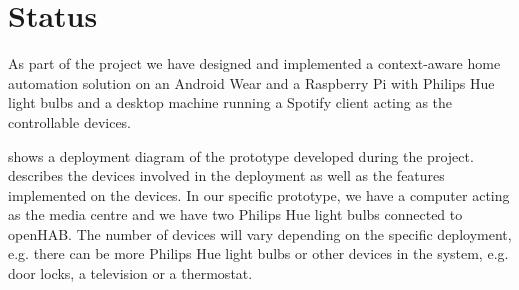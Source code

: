 \section{Status}
\label{sec:implementation:status}

As part of the project we have designed and implemented a context-aware home automation solution on an Android Wear and a Raspberry Pi with Philips Hue light bulbs and a desktop machine running a Spotify client acting as the controllable devices. 

 shows a deployment diagram of the prototype developed during the project.  describes the devices involved in the deployment as well as the features implemented on the devices. In our specific prototype, we have a computer acting as the media centre and we have two Philips Hue light bulbs connected to openHAB. The number of devices will vary depending on the specific deployment, e.g. there can be more Philips Hue light bulbs or other devices in the system, e.g. door locks, a television or a thermostat.

